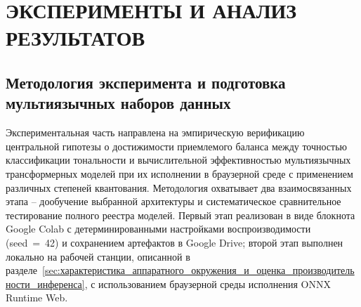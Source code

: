 \chapter{ЭКСПЕРИМЕНТЫ И АНАЛИЗ РЕЗУЛЬТАТОВ}
\label{ch:эксперименты_и_анализ_результатов}

\section{Методология эксперимента и подготовка мультиязычных наборов данных}
\label{sec:методология_эксперимента_и_подготовка_мультиязычных_наборов_данных}

Экспериментальная часть направлена на эмпирическую верификацию центральной гипотезы о достижимости приемлемого баланса между точностью классификации тональности и вычислительной эффективностью мультиязычных трансформерных моделей при их исполнении в браузерной среде с применением различных степеней квантования. Методология охватывает два взаимосвязанных этапа – дообучение выбранной архитектуры и систематическое сравнительное тестирование полного реестра моделей. Первый этап реализован в виде блокнота Google Colab с детерминированными настройками воспроизводимости (seed~=~42) и сохранением артефактов в Google Drive; второй этап выполнен локально на рабочей станции, описанной в разделе~\ref{sec:характеристика_аппаратного_окружения_и_оценка_производительности_инференса}, с использованием браузерной среды исполнения ONNX Runtime Web.

